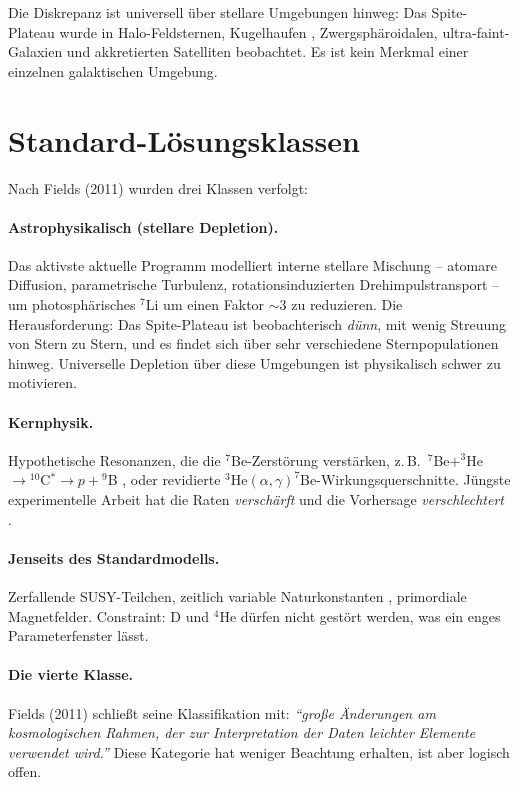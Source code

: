 \documentclass[11pt,a4paper]{article}
\begin{document}
Die Diskrepanz ist universell über stellare Umgebungen hinweg: Das Spite-Plateau wurde in Halo-Feldsternen, Kugelhaufen \cite{cyburt2008}, Zwergsphäroidalen, ultra-faint-Galaxien und akkretierten Satelliten \cite{borisov2024} beobachtet. Es ist kein Merkmal einer einzelnen galaktischen Umgebung.

\section{Standard-Lösungsklassen}

Nach Fields (2011) wurden drei Klassen verfolgt:

\paragraph{Astrophysikalisch (stellare Depletion).}
Das aktivste aktuelle Programm \cite{borisov2024} modelliert interne stellare Mischung -- atomare Diffusion, parametrische Turbulenz, rotationsinduzierten Drehimpulstransport -- um photosphärisches $^7$Li um einen Faktor $\sim 3$ zu reduzieren. Die Herausforderung: Das Spite-Plateau ist beobachterisch \emph{dünn}, mit wenig Streuung von Stern zu Stern, und es findet sich über sehr verschiedene Sternpopulationen hinweg. Universelle Depletion über diese Umgebungen ist physikalisch schwer zu motivieren.

\paragraph{Kernphysik.}
Hypothetische Resonanzen, die die $^7$Be-Zerstörung verstärken, z.\,B.\ $^7$Be$ + ^{3}$He $\to {}^{10}$C$^* \to p + {}^{9}$B \cite{fields2011,hammache2013}, oder revidierte $^3$He$(\alpha,\gamma)^7$Be-Wirkungsquerschnitte. Jüngste experimentelle Arbeit hat die Raten \emph{verschärft} und die Vorhersage \emph{verschlechtert} \cite{cyburt2008}.

\paragraph{Jenseits des Standardmodells.}
Zerfallende SUSY-Teilchen, zeitlich variable Naturkonstanten \cite{uzan2003}, primordiale Magnetfelder. Constraint: D und $^4$He dürfen nicht gestört werden, was ein enges Parameterfenster lässt.

\paragraph{Die vierte Klasse.}
Fields (2011) schließt seine Klassifikation mit: \emph{``große Änderungen am kosmologischen Rahmen, der zur Interpretation der Daten leichter Elemente verwendet wird.''} Diese Kategorie hat weniger Beachtung erhalten, ist aber logisch offen.
\end{document}
